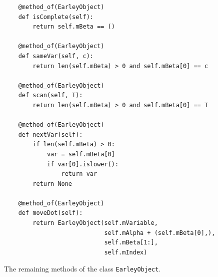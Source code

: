 \begin{figure}[!ht]
\centering
\begin{verbatim}
    @method_of(EarleyObject)
    def isComplete(self):
        return self.mBeta == ()

    @method_of(EarleyObject)
    def sameVar(self, c):
        return len(self.mBeta) > 0 and self.mBeta[0] == c

    @method_of(EarleyObject)
    def scan(self, T):
        return len(self.mBeta) > 0 and self.mBeta[0] == T

    @method_of(EarleyObject)
    def nextVar(self):
        if len(self.mBeta) > 0:
            var = self.mBeta[0]
            if var[0].islower():
                return var
        return None

    @method_of(EarleyObject)
    def moveDot(self):
        return EarleyObject(self.mVariable,
                            self.mAlpha + (self.mBeta[0],),
                            self.mBeta[1:],
                            self.mIndex)
\end{verbatim}
\vspace*{-0.3cm}
\caption{The remaining methods of the class \texttt{EarleyObject}.}
\label{fig:01-Earley-Parser.ipynb:EarleyObject:methods}
\end{figure}

